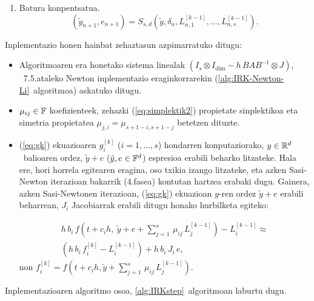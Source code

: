 \begin{enumerate}
\begin{enumerate}
\item Batura konpentsatua.
\begin{equation*}
(\tilde y_{n+1},e_{n+1}) = S_{s,d}(\tilde y, \delta_n, L_{n,1}^{[k-1]}, \ldots, L_{n,s}^{[k-1]}).
\end{equation*}

\end{enumerate}

\end{enumerate}

 
Inplementazio honen hainbat zehaztasun azpimarratuko ditugu:
\begin{itemize}

\item Algoritmoaren era honetako sistema linealak $(I_s \otimes I_\dim  - h \, B A B^{-1} \otimes J )$, ~7.5.ataleko Newton inplementazio eraginkorrarekin  (\ref{alg:IRK-Newton-Li}~algoritmoa) askatuko ditugu.

\item $\mu_{i j} \in \mathbb{F}$ koefizienteek, zehazki (\ref{eq:simplektik2}) propietate sinplektikoa  eta simetria propietatea $\mu_{j, i} = \mu_{s+1-i,s+1-j}$  betetzen dituzte.

\item (\ref{eq:gk}) ekuazioaren $g_i^{[k]}$  ($i=1,\dots,s$) hondarren  konputaziorako, $y\in \mathbb{R}^d$~balioaren ordez, $\tilde y + e$ ($\tilde y, e \in \mathbb{F}^d$) espresioa erabili beharko litzateke. Hala ere, hori horrela egitearen eragina, oso txikia izango litzateke, eta azken Sasi-Newton iterazioan  bakarrik (4.fasea) kontutan hartzea erabaki dugu.  Gainera, azken Sasi-Newtonen iterazioan, (\ref{eq:gk}) ekuazioan $y$-ren ordez $\tilde{y}+e$ erabili beharrean, $J_i$ Jacobiarrak erabili ditugu honako hurbilketa egiteko:

\begin{gather*}
 h \, b_i\, f\left(t+c_i h, \ \tilde y + e +\sum_{j=1}^{s}\, \mu_{ij}\, L_{j}^{[k-1]}\right)  -L_{i}^{[k-1]} \approx \\
\left(h \, b_i\, f_i^{[k]} -L_{i}^{[k-1]} \right) + h\, b_i \, J_i \, e,
\end{gather*}
%
non $f_i^{[k]}=f\left(t+c_i h,  \tilde y +\sum_{j=1}^{s}\, \mu_{ij}\, L_{j}^{[k-1]}\right)$.

\end{itemize}

Inplementazioaren algoritmo osoa, \ref{alg:IRKstep}~algoritmoan laburtu dugu. 

